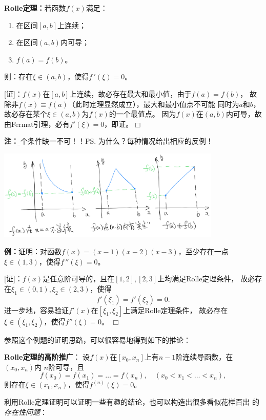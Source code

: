 \begin{thx}
	{\bf Rolle定理：}若函数$f(x)$满足：
	\begin{enumerate}[(1)]
	  \setlength{\itemindent}{1cm}
	  \item 在区间$[a,b]$上连续；
	  \item 在区间$(a,b)$内可导；
	  \item $f(a)=f(b)$。
	\end{enumerate}
	则：存在$\xi\in(a,b)$，使得$f\,'(\xi)=0$。
\end{thx}

[证]：$f(x)$在$[a,b]$上连续，故必存在最大和最小值，由于$f(a)=f(b)$，
故除非$f(x)\equiv f(a)$（此时定理显然成立），最大和最小值点不可能
同时为$a$和$b$，故必存在某个$\xi\in(a,b)$为$f(x)$的一个最值点。
因为$f(x)$在$(a,b)$内可导，故由Fermat引理，必有$f'(\xi)=0$，即证。\hfill$\Box$

{\bf 注：}{\b 三个条件缺一不可！！}\ps{为什么？每种情况给出相应的反例！}

\begin{center}
	\includegraphics[width=0.8\textwidth]{./images/ch3/antiRolle.jpg}
\end{center}

{\bf 例：}证明：对函数$f(x)=(x-1)(x-2)(x-3)$，至少存在一点
$\xi\in(1,3)$，使得$f\,''(\xi)=0$。

[证]：$f(x)$是任意阶可导的，且在$[1,2],[2,3]$上均满足Rolle定理条件，
故必存在$\xi_1\in(0,1),\xi_2\in(2,3)$，使得
$$f'(\xi_1)=f'(\xi_2)=0.$$
进一步地，容易验证$f'(x)$在$[\xi_1,\xi_2]$上满足Rolle定理条件，
故必存在$\xi\in(\xi_1,\xi_2)$，使得$f''(\xi)=0$。
\hfill$\Box$

参照这个例题的证明思路，可以很容易地得到如下的推论：

\begin{thx}
	{\bf Rolle定理的高阶推广}：
	设$f(x)$在$[x_0,x_n]$上有$n-1$阶连续导函数，在$(x_0,x_n)$内
	$n$阶可导，且
	$$f(x_0)=f(x_1)=\ldots=f(x_n),\quad(x_0<x_1<\ldots<x_n),$$
	则存在$\xi\in(x_0,x_n)$，使得$f^{(n)}(\xi)=0$。
\end{thx}

利用Rolle定理证明可以证明一些有趣的结论，也可以构造出很多看似花样百出
的{\it 存在性问题}：


